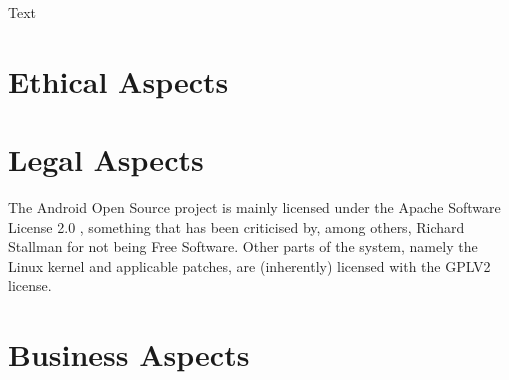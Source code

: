 \documentclass[conference]{IEEEtran}
\begin{document}
{Text}


\section{Ethical Aspects}
\label{ethics}




\section{Legal Aspects}
\label{legal}

{The Android Open Source project is mainly licensed under the Apache Software License 2.0 \cite{apache-license}, something that has been criticised by, among others, Richard Stallman for not being Free Software\cite{rms-android}. Other parts of the system, namely the Linux kernel and applicable patches, are (inherently) licensed with the GPLV2 license\cite{gplv2}\cite{android-licenses}.}


\section{Business Aspects}
\label{financial}
\end{document}
